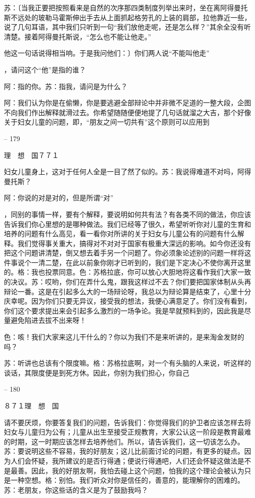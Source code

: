 \documentclass[11pt,oneside]{book}
\begin{document}
\begin{common-format}
    苏：〔当我正要把按照看来是自然的次序那四类制度列举出来时，坐在离阿得曼托斯不远处的玻勒马霍斯伸出手去从上面抓起格劳孔的上装的肩部，拉他靠近一些，说了几句耳语，其中我们只听到一句“我们放他走呢，还是怎么样？”其余全没有听清楚。接着阿得曼托斯说，“怎么也不能让他走。”

    他这一句话说得相当响。于是我问他们：〕你们两人说“不能叫他走”

    ，请问这个“他”是指的谁？

    阿：指的你。苏：指我，请问是为什么？

    阿：我们认为你是在偷懒，你是要逃避全部辩论中并非微不足道的一整大段，企图不向我们作出解释就滑过去。你希望随随便便地提了几句话就溜之大吉，那个好像关于妇女儿童的问题，即，“朋友之间一切共有”这个原则可以应用到

    

-- 179

    理　想　国７７１

    妇女儿童身上，这对于任何人全是一目了然了似的。苏：我说得难道不对吗，阿得曼托斯？

    阿：你说的对是对的，但是所谓“对”

    ，同别的事情一样，要有个解释，要说明如何共有法？有各类不同的做法，你应该告诉我们你心里想的是哪种做法。我们已经等了很久，希望听听你对儿童的生育和培养的问题有什么高见，看一看你对所讲的关于妇女与儿童公有的问题有什么解释。我们觉得事关重大，搞得对不对对于国家有极重大深远的影响。如今你还没有把这个问题讲清楚，倒又想去着手另一个问题了。你必须象论述别的问题一样将这件事说个一清二楚，在此以前象你刚才已听到的，我们是下定决心不使你离开这里的。格：我也投票同意。色：苏格拉底，你可以放心大胆地将这看作我们大家一致的决议。苏：哎哟，你们在弄什么鬼，跟我这样过不去？你们要把国家体制从头再辩论一番。这是在引起多么大的一场辩论呀，我总以为辩论算是结束了，心里十分庆幸呢。因为你们只要无异议，接受我的想法，我便心满意足了。你们没有看到，你们这个要求提出来会引起多么激烈的一场争论。我是早就预料到的，因此我是尽量避免陷进去拔不出来呀！

    色：咳！我们大家来这儿干什么的？你以为我们不是来听讲的，是来淘金发财的吗？

    苏：听讲也总该有个限度嘛。格：苏格拉底啊，对一个有头脑的人来说，听这样的谈话，其限度便是到死方休。因此，你别为我们担心，你自己

    

-- 180

    ８７１理　想　国

    请不要厌烦，你要答复我们的问题，告诉我们：你觉得我们的护卫者应该怎样去将妇女与儿童归为公有；儿童从出生至接受正规教育，大家公认这一阶段是教育最难的时期，这一时期应该怎样去培养他们。所以，请告诉我们，这一切该怎么办。苏：要说明这些不容易，我的好朋友；这儿比前面讨论的问题，有更多的疑点。因为人们会怀疑，我所建议的是否行得通；便说行得通吧，人们还会怀疑这做法是不是最善。因此，我的好朋友啊，我怕去碰上这个问题，怕我的这个理论会被认为只是一种空想。格：别怕。我们听众对你是信任的，善意的，能理解你的困难的。苏：老朋友，你这些话的含义是为了鼓励我吗？


\end{common-format}
\end{document}

